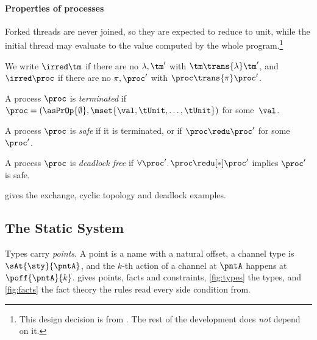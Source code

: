 \paragraph{Properties of processes}
Forked threads are never joined, so they are expected to reduce to unit,
while the initial thread may evaluate to the value computed by the whole
program.\footnote{This design decision is from
  \citet{conf/esop/LindleyM15}. The rest of the development does
  \emph{not} depend on it.}

\begin{definition}
We write $\irred \tm$ if there are no $\lambda, \tm'$ with
$\tm \trans{\lambda} \tm'$, and $\irred \proc$ if there are no
$\pi, \proc'$ with $\proc \trans{\pi} \proc'$.
\end{definition}

\begin{definition}
\label{def:terminated}
  A process $\proc$ is \emph{terminated} if
  $\proc = (\asPrOp{\emptyset}, \mset{\val,\tUnit,\dots,\tUnit})$
  for some~$\val$.
\end{definition}

\begin{definition}
\label{def:safe}
  A process $\proc$ is \emph{safe} if it is terminated, or if
  $\proc \redu \proc'$ for some~$\proc'$.
\end{definition}

\begin{definition}
  \label{def:df}
  A process $\proc$ is \emph{deadlock free} if
  ${\forall \proc'.\,\proc \redu[*] \proc'}$ implies $\proc'$ is safe.
\end{definition}







 gives the exchange, cyclic topology and deadlock examples.

\subsection{The Static System}
\label{sec:syntacticTyping}
\label{sec:syntacticTyping:typeSys}

Types carry \emph{points}. A point is a name with a natural offset, a
channel type is $\sAt{\sty}{\pntA}$, and the $k$-th action of a channel
at $\pntA$ happens at $\poff{\pntA}{k}$.  gives points,
facts and constraints, \cref{fig:types} the types, and
\cref{fig:facts} the fact theory the rules read every side condition
from.

